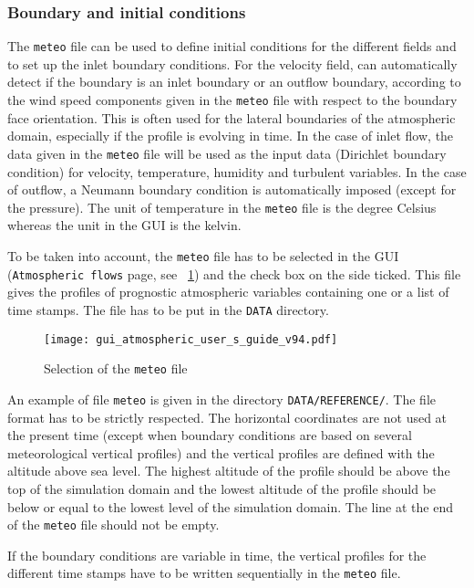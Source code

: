 {{\subsubsection{Boundary and initial conditions}\label{sec:atmo_BCs}
%
The \texttt{meteo} file can be used to define initial conditions for the
different fields and to set up the inlet boundary conditions. For the velocity
field, \CS can automatically detect if the boundary is an inlet boundary or an
outflow boundary, according to the wind speed components given in the
\texttt{meteo} file with respect to the boundary face orientation. This is often
used for the lateral boundaries of the atmospheric domain, especially if the
profile is evolving in time. In the case of inlet flow, the data given in the
\texttt{meteo} file will be used as the input data (Dirichlet boundary condition)
for velocity, temperature, humidity and turbulent variables. In the case of
outflow, a Neumann boundary condition is automatically imposed (except for the
pressure). The unit of temperature in the \texttt{meteo} file is the degree
Celsius whereas the unit in the GUI is the kelvin.

To be taken into account, the \texttt{meteo} file has to be selected in the GUI
(\texttt{Atmospheric flows} page, see \figurename~\ref{fig:meteo}) and the check
box on the side ticked. This file gives the profiles of prognostic atmospheric
variables containing one or a list of time stamps. The file has to be put in the
\texttt{DATA} directory.
%
\begin{figure}[htbp]
\centerline{\texttt{[image: gui\_atmospheric\_user\_s\_guide\_v94.pdf]}}
\caption{Selection of the \texttt{meteo} file}
\label{fig:meteo}
\end{figure}
%
An example of file \texttt{meteo} is given in the directory
\texttt{DATA/REFERENCE/}. The file format has to be strictly respected.
The horizontal coordinates are not used at the present time (except when
boundary conditions are based on several meteorological vertical profiles)
and the vertical profiles are defined with the altitude above sea level. The
highest altitude of the profile should be above the top of the simulation domain
and the lowest altitude of the profile should be below or equal to the lowest
level of the simulation domain. The line at the end of the \texttt{meteo} file
should not be empty.

If the boundary conditions are variable in time, the vertical profiles for
the different time stamps have to be written sequentially in the \texttt{meteo}
file.

}}
